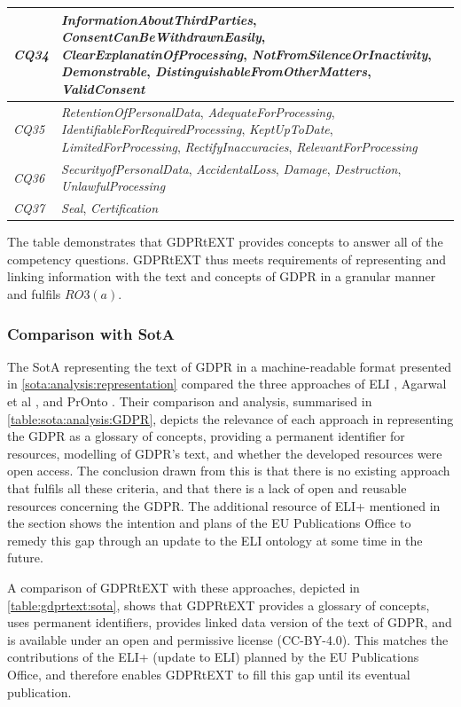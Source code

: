 \begin{table}[htbp]
\begin{tabularx}{\textwidth}{|l|X|}
\textit{CQ34} & \textit{InformationAboutThirdParties}, \textit{ConsentCanBeWithdrawnEasily}, \textit{ClearExplanatinOfProcessing}, \textit{NotFromSilenceOrInactivity}, \textit{Demonstrable}, \textit{DistinguishableFromOtherMatters}, \textit{ValidConsent} \\ \hline
\textit{CQ35} & \textit{RetentionOfPersonalData}, \textit{AdequateForProcessing}, \textit{IdentifiableForRequiredProcessing}, \textit{KeptUpToDate}, \textit{LimitedForProcessing}, \textit{RectifyInaccuracies}, \textit{RelevantForProcessing} \\ \hline
\textit{CQ36} & \textit{SecurityofPersonalData}, \textit{AccidentalLoss}, \textit{Damage}, \textit{Destruction}, \textit{UnlawfulProcessing} \\ \hline
\textit{CQ37} & \textit{Seal}, \textit{Certification}
\end{tabularx}
\end{table}
The table demonstrates that GDPRtEXT provides concepts to answer all of the competency questions. GDPRtEXT thus meets requirements of representing and linking information with the text and concepts of GDPR in a granular manner and fulfils $RO3(a)$.

\subsubsection{Comparison with SotA}
The SotA representing the text of GDPR in a machine-readable format presented in \autoref{sota:analysis:representation} compared the three approaches of ELI \cite{thomas_european_2019}, Agarwal et al \cite{agarwal_legislative_2018}, and PrOnto \cite{palmirani_pronto_2018,palmirani_pronto_2018-1}.
Their comparison and analysis, summarised in \autoref{table:sota:analysis:GDPR}, depicts the relevance of each approach in representing the GDPR as a glossary of concepts, providing a permanent identifier for resources, modelling of GDPR's text, and whether the developed resources were open access.
The conclusion drawn from this is that there is no existing approach that fulfils all these criteria, and that there is a lack of open and reusable resources concerning the GDPR. 
The additional resource of ELI+ mentioned in the section shows the intention and plans of the EU Publications Office to remedy this gap through an update to the ELI ontology at some time in the future.

A comparison of GDPRtEXT with these approaches, depicted in \autoref{table:gdprtext:sota}, shows that GDPRtEXT provides a glossary of concepts, uses permanent identifiers, provides linked data version of the text of GDPR, and is available under an open and permissive license (CC-BY-4.0).
This matches the contributions of the ELI+ (update to ELI) planned by the EU Publications Office, and therefore enables GDPRtEXT to fill this gap until its eventual publication.

